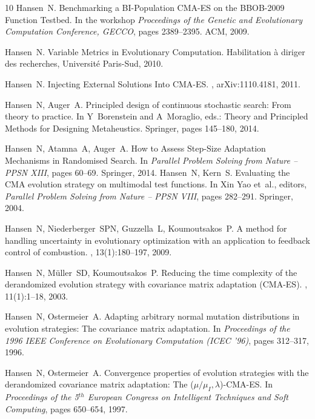 \documentclass{article} %
\begin{document}
\begin{thebibliography}{10}
Hansen~N.
\newblock Benchmarking a BI-Population CMA-ES on the BBOB-2009 Function Testbed. 
\newblock In the workshop {\em Proceedings of the Genetic and Evolutionary Computation Conference, GECCO}, pages 2389--2395. ACM, 2009. 

Hansen~N. 
\newblock Variable Metrics in Evolutionary Computation. 
\newblock Habilitation {\`{a}} diriger des recherches, Universit{\'{e}} Paris-Sud, 2010.

Hansen~N. 
\newblock Injecting External Solutions Into {CMA-ES}.
, arXiv:1110.4181, 2011. 

Hansen~N, Auger~A.
\newblock Principled design of continuous stochastic search: From theory to practice. 
\newblock In Y~Borenstein and A~Moraglio, eds.: Theory and Principled Methods for Designing Metaheustics. Springer, pages 145--180, 2014. 

Hansen~N, Atamna~A, Auger~A. 
\newblock How to Assess Step-Size Adaptation Mechanisms in Randomised Search. 
\newblock In {\em Parallel Problem Solving from Nature -- PPSN XIII}, pages 60--69. Springer, 2014.
Hansen~N, Kern~S.
\newblock Evaluating the {CMA} evolution strategy on multimodal test functions.
\newblock In Xin Yao et~al., editors, {\em Parallel Problem Solving from Nature
  -- PPSN VIII}, pages 282--291. Springer, 2004.

Hansen~N, Niederberger~SPN, Guzzella~L, Koumoutsakos~P. 
\newblock
  A method for
  handling uncertainty in evolutionary optimization with an application to
  feedback control of combustion. 
  , 
  13(1):180--197, 2009.

Hansen~N, M\"{u}ller~SD, Koumoutsakos~P.
\newblock Reducing the time complexity of the derandomized evolution strategy
  with covariance matrix adaptation {(CMA-ES)}.
, 11(1):1--18, 2003.

Hansen~N, Ostermeier~A.
\newblock Adapting arbitrary normal mutation distributions in evolution
  strategies: The covariance matrix adaptation.
\newblock In {\em Proceedings of the 1996 IEEE Conference on Evolutionary
  Computation ({ICEC '96})}, pages 312--317, 1996.

Hansen~N, Ostermeier~A.
\newblock Convergence properties of evolution strategies with the derandomized
  covariance matrix adaptation: The ($\mu/\mu_{I},\lambda$)-{CMA}-{ES}.
\newblock In {\em Proceedings of the 5$^{th}$ European Congress on Intelligent
  Techniques and Soft Computing}, pages 650--654, 1997.


\end{thebibliography}
\end{document}
